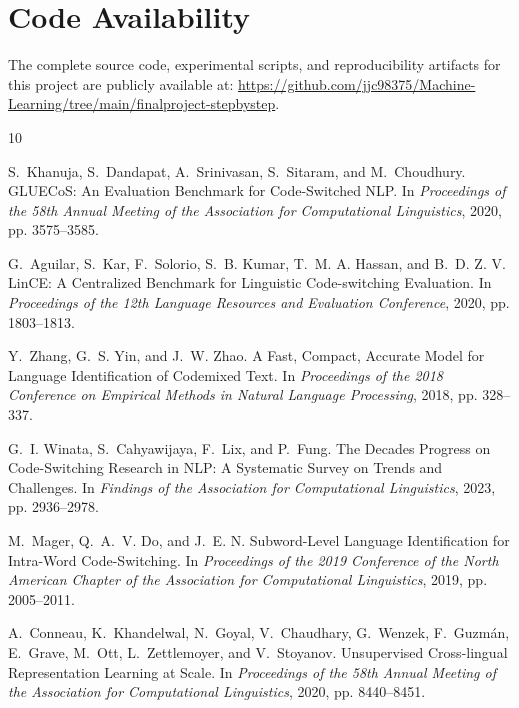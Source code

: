 \documentclass[sigconf,nonacm]{acmart}
\begin{document}
\section*{Code Availability}
The complete source code, experimental scripts, and reproducibility artifacts for this project are publicly available at: \url{https://github.com/jjc98375/Machine-Learning/tree/main/finalproject-stepbystep}.



\begin{thebibliography}{10}

S.~Khanuja, S.~Dandapat, A.~Srinivasan, S.~Sitaram, and M.~Choudhury.
\newblock GLUECoS: An Evaluation Benchmark for Code-Switched NLP.
\newblock In \emph{Proceedings of the 58th Annual Meeting of the Association for Computational Linguistics}, 2020, pp. 3575--3585.

G.~Aguilar, S.~Kar, F.~Solorio, S.~B. Kumar, T.~M. A. Hassan, and B.~D. Z. V. 
\newblock LinCE: A Centralized Benchmark for Linguistic Code-switching Evaluation.
\newblock In \emph{Proceedings of the 12th Language Resources and Evaluation Conference}, 2020, pp. 1803--1813.

Y.~Zhang, G.~S. Yin, and J.~W. Zhao.
\newblock A Fast, Compact, Accurate Model for Language Identification of Codemixed Text.
\newblock In \emph{Proceedings of the 2018 Conference on Empirical Methods in Natural Language Processing}, 2018, pp. 328--337.

G.~I. Winata, S.~Cahyawijaya, F.~Lix, and P.~Fung.
\newblock The Decades Progress on Code-Switching Research in NLP: A Systematic Survey on Trends and Challenges.
\newblock In \emph{Findings of the Association for Computational Linguistics}, 2023, pp. 2936--2978.

M.~Mager, Q.~A.~V. Do, and J.~E. N. 
\newblock Subword-Level Language Identification for Intra-Word Code-Switching.
\newblock In \emph{Proceedings of the 2019 Conference of the North American Chapter of the Association for Computational Linguistics}, 2019, pp. 2005--2011.

A.~Conneau, K.~Khandelwal, N.~Goyal, V.~Chaudhary, G.~Wenzek, F.~Guzmán, E.~Grave, M.~Ott, L.~Zettlemoyer, and V.~Stoyanov.
\newblock Unsupervised Cross-lingual Representation Learning at Scale.
\newblock In \emph{Proceedings of the 58th Annual Meeting of the Association for Computational Linguistics}, 2020, pp. 8440--8451.


\end{thebibliography}
\end{document}
